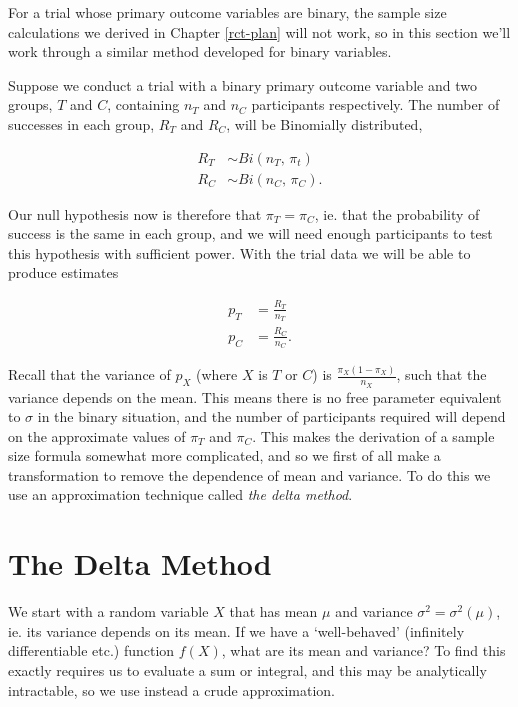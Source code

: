 \documentclass[
  openany]{book}
\theoremstyle{definition}
\theoremstyle{definition}
\theoremstyle{definition}
\theoremstyle{definition}
\theoremstyle{remark}
\begin{document}
For a trial whose primary outcome variables are binary, the sample size calculations we derived in Chapter \ref{rct-plan} will not work, so in this section we'll work through a similar method developed for binary variables.

Suppose we conduct a trial with a binary primary outcome variable and two groups, \(T\) and \(C\), containing \(n_T\) and \(n_C\) participants respectively. The number of successes in each group, \(R_T\) and \(R_C\), will be Binomially distributed,

\begin{align*}
      R_T &\sim{Bi\left(n_T,\, \pi_t\right)} \\
      R_C &\sim{Bi\left(n_C,\,\pi_C\right)}.
\end{align*}

Our null hypothesis now is therefore that \(\pi_T = \pi_C\), ie. that the probability of success is the same in each group, and we will need enough participants to test this hypothesis with sufficient power. With the trial data we will be able to produce estimates

\begin{align*}
      p_T & = \frac{R_T}{n_T} \\
      p_C & = \frac{R_C}{n_C}.
\end{align*}

Recall that the variance of \(p_X\) (where \(X\) is \(T\) or \(C\)) is \(\frac{\pi_X\left(1-\pi_X\right)}{n_X}\), such that the variance depends on the mean. This means there is no free parameter equivalent to \(\sigma\) in the binary situation, and the number of participants required will depend on the approximate values of \(\pi_T\) and \(\pi_C\). This makes the derivation of a sample size formula somewhat more complicated, and so we first of all make a transformation to remove the dependence of mean and variance. To do this we use an approximation technique called \emph{the delta method}.

\section{The Delta Method}\label{delta-method}

We start with a random variable \(X\) that has mean \(\mu\) and variance \(\sigma^2 = \sigma^2\left(\mu\right)\), ie. its variance depends on its mean. If we have a `well-behaved' (infinitely differentiable etc.) function \(f\left(X\right)\), what are its mean and variance? To find this exactly requires us to evaluate a sum or integral, and this may be analytically intractable, so we use instead a crude approximation.
\end{document}
